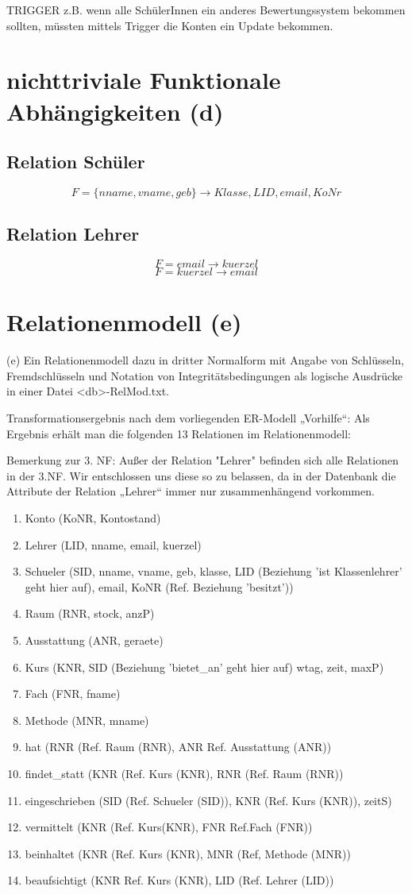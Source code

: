 \documentclass[fleqn]{scrartcl}
\begin{document}
TRIGGER  z.B. wenn alle SchülerInnen ein anderes Bewertungssystem bekommen sollten, 
müssten mittels Trigger die Konten ein Update bekommen. 

\section{ nichttriviale Funktionale Abhängigkeiten (d) }

\subsection{Relation Schüler} 
 \[F=\{nname, vname, geb\} \rightarrow Klasse, LID, email, KoNr \]

\subsection{Relation Lehrer}	
\[F=email \rightarrow kuerzel\]
\[F=kuerzel \rightarrow email\]

\section{Relationenmodell (e)}
(e) Ein Relationenmodell dazu in dritter Normalform mit Angabe von Schlüsseln, Fremdschlüsseln und Notation von Integritätsbedingungen als logische Ausdrücke in einer Datei <db>-RelMod.txt.

Transformationsergebnis nach dem vorliegenden ER-Modell „Vorhilfe“: 
Als Ergebnis erhält man die folgenden 13 Relationen im Relationenmodell: 

Bemerkung zur 3. NF: 
Außer der Relation "Lehrer" befinden sich alle Relationen in der 3.NF. Wir entschlossen uns diese so zu belassen, da in der Datenbank die  Attribute der Relation „Lehrer“ immer nur zusammenhängend vorkommen. 
\begin{enumerate}
\item Konto (KoNR, Kontostand)
\item Lehrer (LID, nname, email, kuerzel)
\item Schueler (SID, nname, vname, geb, klasse, LID (Beziehung 'ist Klassenlehrer' geht hier auf), email, KoNR (Ref. Beziehung 'besitzt'))
\item Raum (RNR, stock, anzP)
\item Ausstattung (ANR, geraete)
\item Kurs (KNR, SID (Beziehung 'bietet\_an' geht hier auf) wtag, zeit, maxP)
\item Fach (FNR, fname)
\item Methode (MNR, mname)
\item hat (RNR (Ref. Raum (RNR), ANR  Ref. Ausstattung (ANR))
\item findet\_statt (KNR (Ref. Kurs (KNR), RNR (Ref. Raum (RNR))
\item eingeschrieben (SID (Ref. Schueler (SID)), KNR (Ref. Kurs (KNR)), zeitS)
\item vermittelt (KNR (Ref. Kurs(KNR), FNR Ref.Fach (FNR))
\item beinhaltet (KNR (Ref. Kurs (KNR), MNR (Ref, Methode (MNR))
\item beaufsichtigt (KNR Ref. Kurs (KNR), LID (Ref. Lehrer (LID))
\end{enumerate}
\end{document}
